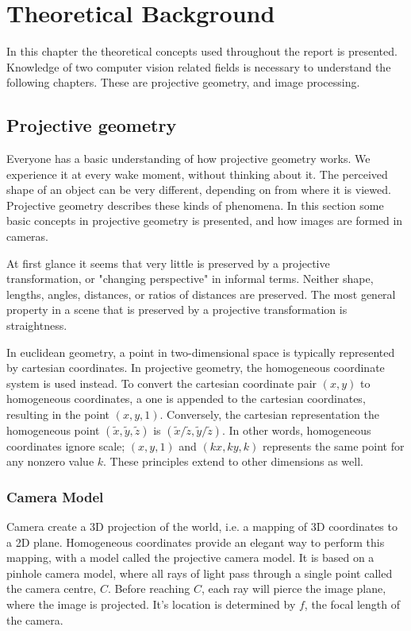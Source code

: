 \chapter{Theoretical Background}

In this chapter the theoretical concepts used throughout the report is presented. Knowledge of two computer vision related fields is necessary to understand the following chapters. These are projective geometry, and image processing.

\section{Projective geometry}
Everyone has a basic understanding of how projective geometry works.
We experience it at every wake moment, without thinking about it. 
The perceived shape of an object can be very different, depending on from where it is viewed.
Projective geometry describes these kinds of phenomena.
In this section some basic concepts in projective geometry is presented, and how images are formed in cameras.

At first glance it seems that very little is preserved by a projective transformation, or "changing perspective" in informal terms.
Neither shape, lengths, angles, distances, or ratios of distances are preserved.
The most general property in a scene that is preserved by a projective transformation is straightness. \cite[1]{hartley-zisserman}

In euclidean geometry, a point in two-dimensional space is typically represented by cartesian coordinates.
In projective geometry, the homogeneous coordinate system is used instead.
To convert the cartesian coordinate pair $(x,y)$ to homogeneous coordinates, a one is appended to the cartesian coordinates, resulting in the point $(x,y,1)$. 
Conversely, the cartesian representation the homogeneous point $(\tilde{x},\tilde{y},\tilde{z})$ is $(\tilde{x}/\tilde{z},\tilde{y}/\tilde{z})$. 
In other words, homogeneous coordinates ignore scale; $(x,y,1)$ and $(kx,ky,k)$ represents the same point for any nonzero value $k$.
These principles extend to other dimensions as well. \cite[2]{hartley-zisserman}

\subsection{Camera Model}\label{camera-model}
Camera create a 3D projection of the world, i.e. a mapping of 3D coordinates to a 2D plane.
Homogeneous coordinates provide an elegant way to perform this mapping, with a model called the projective camera model.
It is based on a pinhole camera model, where all rays of light pass through a single point called the camera centre, $C$. Before reaching $C$, each ray will pierce the image plane, where the image is projected.
It's location is determined by $f$, the focal length of the camera.

